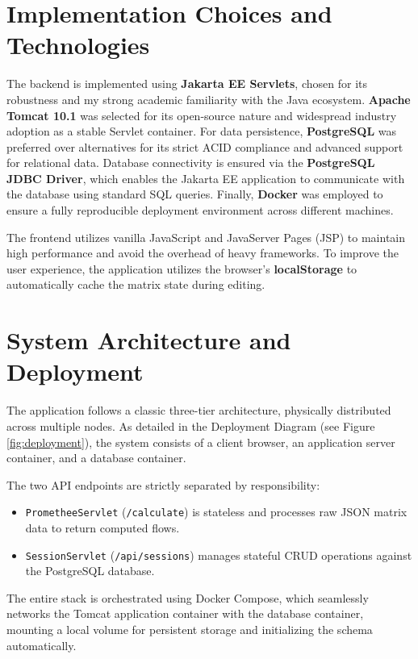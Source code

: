 \documentclass[12pt,a4paper,oneside]{report}
\begin{document}
\section{Implementation Choices and Technologies}
The backend is implemented using \textbf{Jakarta EE Servlets}, chosen for its robustness and my strong academic familiarity with the Java ecosystem. \textbf{Apache Tomcat 10.1} was selected for its open-source nature and widespread industry adoption as a stable Servlet container. For data persistence, \textbf{PostgreSQL} was preferred over alternatives for its strict ACID compliance and advanced support for relational data. Database connectivity is ensured via the \textbf{PostgreSQL JDBC Driver}, which enables the Jakarta EE application to communicate with the database using standard SQL queries. Finally, \textbf{Docker} was employed to ensure a fully reproducible deployment environment across different machines.

The frontend utilizes vanilla JavaScript and JavaServer Pages (JSP) to maintain high performance and avoid the overhead of heavy frameworks. To improve the user experience, the application utilizes the browser's \textbf{localStorage} to automatically cache the matrix state during editing.

\section{System Architecture and Deployment}
The application follows a classic three-tier architecture, physically distributed across multiple nodes. As detailed in the Deployment Diagram (see Figure \ref{fig:deployment}), the system consists of a client browser, an application server container, and a database container.

The two API endpoints are strictly separated by responsibility: 
\begin{itemize}
    \item \texttt{PrometheeServlet} (\texttt{/calculate}) is stateless and processes raw JSON matrix data to return computed flows.
    \item \texttt{SessionServlet} (\texttt{/api/sessions}) manages stateful CRUD operations against the PostgreSQL database.
\end{itemize}

The entire stack is orchestrated using Docker Compose, which seamlessly networks the Tomcat application container with the database container, mounting a local volume for persistent storage and initializing the schema automatically.
\end{document}
